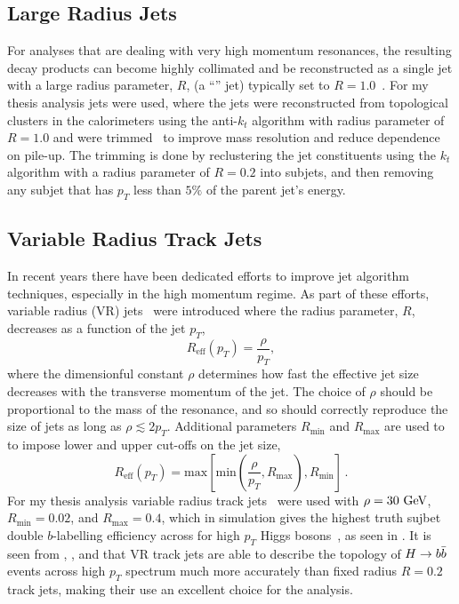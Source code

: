 \subsection{Large Radius Jets}\label{subsection:largeR_jets}

For analyses that are dealing with very high momentum resonances, the resulting decay products can become highly collimated and be reconstructed as a single jet with a large radius parameter, $R$, (a ``\largeR{}'' jet) typically set to $R=1.0$~\cite{JETM-2018-02,SUSY-2016-13}.
For my thesis analysis \largeR{} jets were used, where the \largeR{} jets were reconstructed from topological clusters in the calorimeters using the anti-$k_{t}$ algorithm with radius parameter of $R=1.0$ and were trimmed~\cite{Krohn:2009th} to improve mass resolution and reduce dependence on pile-up.
The trimming is done by reclustering the \largeR{} jet constituents using the $k_{t}$ algorithm with a radius parameter of $R=0.2$ into subjets, and then removing any subjet that has $p_{T}$ less than $5\%$ of the \largeR{} parent jet's energy.

\subsection{Variable Radius Track Jets}\label{subsection:VR_jets}

In recent years there have been dedicated efforts to improve jet algorithm techniques, especially in the high momentum regime.
As part of these efforts, variable radius (VR) jets~\cite{Krohn:2009zg,ATL-PHYS-PUB-2017-010} were introduced where the radius parameter, $R$, decreases as a function of the jet $p_{T}$,
\[
 R_{\mathrm{eff}} \left(p_{T}\right)= \frac{\rho}{p_{T}},
\]
where the dimensionful constant $\rho$ determines how fast the effective jet size decreases with the transverse momentum of the jet.
The choice of $\rho$ should be proportional to the mass of the resonance, and so should correctly reproduce the size of jets as long as $\rho \lesssim 2 p_{T}$.
Additional parameters $R_{\mathrm{min}}$ and $R_{\mathrm{max}}$ are used to to impose
lower and upper cut-offs on the jet size,
\[
 R_{\mathrm{eff}} \left(p_{T}\right)= \mathrm{max}\left[\mathrm{min}\left(\frac{\rho}{p_{T}},R_{\mathrm{max}}\right),R_{\mathrm{min}}\right]\,.
\]
For my thesis analysis variable radius track jets~\cite{Zenz:2010hfa} were used with $\rho=30~\mathrm{GeV}$, $R_{\mathrm{min}}=0.02$, and $R_{\mathrm{max}}=0.4$, which in simulation gives the highest truth sujbet double $b$-labelling efficiency across for high $p_{T}$ Higgs bosons~\cite{ATL-PHYS-PUB-2017-010}, as seen in .
It is seen from , , and  that VR track jets are able to describe the topology of $H \to b\bar{b}$ events across high $p_{T}$ spectrum much more accurately than fixed radius $R=0.2$ track jets, making their use an excellent choice for the analysis.

